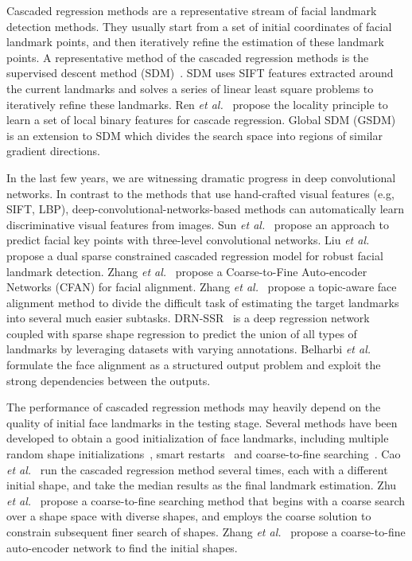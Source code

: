 \documentclass[journal]{IEEEtran}
\begin{document}
Cascaded regression methods are a representative stream of facial landmark detection methods. They usually start from a set of initial coordinates of facial landmark points, and then iteratively refine the estimation of these landmark points. A representative method of the cascaded regression methods is the supervised descent method (SDM)~\cite{sdm}. SDM uses SIFT features extracted around the current landmarks and solves a series of linear least square problems to iteratively refine these landmarks. Ren \textit{et al.}~\cite{lbf} propose the locality principle to learn a set of local binary features for cascade regression. Global SDM (GSDM)~\cite{globalsdm} is an extension to SDM which divides the search space into regions of similar gradient directions.

In the last few years, we are witnessing dramatic progress in deep convolutional networks. In contrast to the methods that use hand-crafted visual features (e.g, SIFT, LBP), deep-convolutional-networks-based methods can automatically learn discriminative visual features from images. Sun \textit{et al.}~\cite{sun2013deep} propose an approach to predict facial key points with three-level convolutional networks. Liu \textit{et al.}~\cite{liu2015dual} propose a dual sparse constrained cascaded regression model for robust facial landmark detection. Zhang \textit{et al.}~\cite{zhang2014coarse} propose a Coarse-to-Fine Auto-encoder Networks (CFAN) for facial alignment. Zhang \textit{et al.}~\cite{zhang2014topic} propose a topic-aware face alignment method to divide the difficult task of estimating the target landmarks into several much easier subtasks. DRN-SSR~\cite{zhang2015leveraging} is a deep regression network coupled with sparse shape regression to predict the union of all types of landmarks by leveraging datasets with varying annotations. Belharbi \textit{et al.}\cite{belharbi2015facial} formulate the face alignment as a structured output problem and exploit the strong dependencies between the outputs.

The performance of cascaded regression methods may heavily depend on the quality of initial face landmarks in the testing stage. Several methods have been developed to  obtain a good initialization of face landmarks, including multiple random shape initializations~\cite{cao2014face}, smart restarts~\cite{burgos2013robust} and coarse-to-fine searching~\cite{cfss,sun2013deep,zhang2014coarse}. Cao \textit{et al.}~\cite{cao2014face} run the cascaded regression method several times, each with a different initial shape, and take the median results as the final landmark estimation. Zhu \textit{et al.}~\cite{cfss} propose a coarse-to-fine searching method that begins with a coarse search over a shape space with diverse shapes, and employs the coarse solution
to constrain subsequent finer search of shapes. Zhang \textit{et al.}~\cite{zhang2014coarse} propose a coarse-to-fine auto-encoder network to find the initial shapes.
\end{document}
